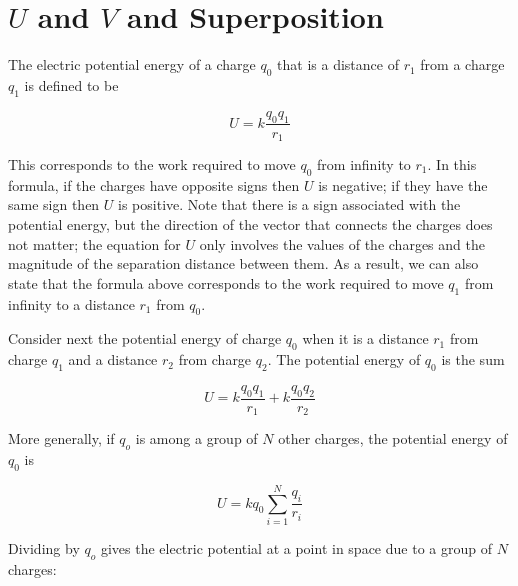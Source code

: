 \documentclass{article}
\begin{document}
\begin{enumerate}
        \vskip 48pt
        \fi

\end{enumerate}

\newpage

\section{$U$ and $V$ and Superposition}






The electric potential energy of a charge $q_0$ that is a distance of $r_1$ from a charge $q_1$ is defined to be 

$$
U=k\frac{q_0q_1}{r_1}
$$

This corresponds to the work required to move $q_0$ from infinity to $r_1$. 
In this formula, if the charges have opposite signs then $U$ is negative; if they have the same sign then $U$  is positive. Note that there is a sign associated with the potential energy, but the direction of the vector that connects the charges does not matter; the equation for $U$ only involves the values of the charges and the magnitude of the separation distance between them. As a result, we can also state that the formula above corresponds to the work required to move $q_1$ from infinity to a distance $r_1$ from $q_0$.

Consider next the potential energy of charge $q_0$ when it is a distance $r_1$ from charge $q_1$ and a distance $r_2$ from charge $q_2$. The potential energy of $q_0$ is the sum

$$
U=k\frac{q_0q_1}{r_1}+k\frac{q_0q_2}{r_2}
$$

More generally, if $q_o$ is among a group of $N$ other charges, the potential energy of $q_0$ is

$$
U=k q_0 \sum_{i=1}^N {\frac{q_i}{r_i}}
$$

Dividing by $q_o$ gives the electric potential at a point in space due to a group of $N$ charges:
\end{document}
